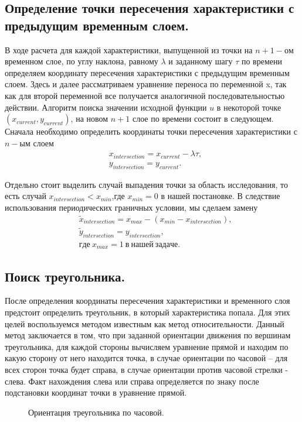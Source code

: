\documentclass[14pt]{article}
\begin{document}
\subsection{Определение точки пересечения характеристики с предыдущим временным слоем.}
В ходе расчета для каждой характеристики, выпущенной из точки на $n+1-ом$ временном слое, по углу наклона, равному $\lambda$ и заданному шагу $\tau$ по времени определяем координату пересечения характеристики с предыдущим временным слоем. Здесь и далее рассматриваем уравнение переноса по переменной x, так как для второй переменной все получается аналогичной последовательностью действии. Алгоритм поиска значении исходной функции $u$ в некоторой точке $(x_{current},y_{current})$, на новом $n+1$ слое по времени состоит в следующем.  Сначала необходимо определить координаты точки пересечения характеристики с $n-ым$ слоем
\begin{equation}
\begin{aligned}
&x_{intersection}=x_{current}- \lambda \tau,\\
&y_{intersection}=y_{current}.
\end{aligned}
\end{equation}

Отдельно стоит выделить случай выпадения точки за область исследования, то есть случай $x_{intersection}<x_{min}$,где $x_{min}=0$ в нашей постановке.  В следствие использования периодических граничных условии, мы сделаем замену 
\begin{equation}
\begin{aligned}
&\widetilde{x}_{intersection}=x_{max}-(x_{min}-x_{intersection} ),\\
&\widetilde{y}_{intersection}=y_{intersection},\\
&где\: x_{max}=1\: в\: нашей\: задаче. 
\end{aligned}
\end{equation}
\subsection{Поиск треугольника.}
После определения координаты пересечения характеристики и временного слоя предстоит определить треугольник, в который характеристика попала. Для этих целей воспользуемся методом известным как метод относительности. Данный метод заключается в том, что при заданной ориентации движения по вершинам треугольника, для каждой стороны вычисляем уравнение прямой и находим по какую сторону от него находится точка, в случае ориентации по часовой – для всех сторон точка будет справа, в случае ориентации против часовой стрелки - слева. Факт нахождения слева или справа определяется по знаку после подстановки координат точки в уравнение прямой. 
\begin{figure}[!h!]
\caption{Ориентация треугольника по часовой.}
\end{figure}
\end{document}
